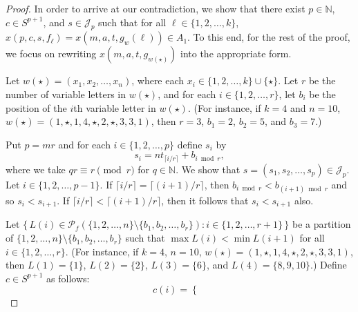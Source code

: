 \documentclass[12pt]{article}
\theoremstyle{plain}
\theoremstyle{definition}
\newcommand{\bbN}{\mathbb{N}}
\newcommand{\calJ}{\mathcal{J}}
\newcommand{\Pf}{\mathcal{P}_f}
\begin{document}
\begin{proof}
  In order to arrive at our contradiction, we show that there exist $p \in \bbN$, $c \in S^{p+1}$, and $s \in \calJ_p$ such that for all $\ell \in \{1, 2, \ldots, k\}$, $ x(p, c, s, f_\ell) = x(m, a, t, g_w(\ell)) \in A_1$. 
  To this end, for the rest of the proof, we focus on rewriting $x(m, a, t, g_{w(\star)})$ into the appropriate form. 

  Let $w(\star) = (x_1, x_2, \ldots, x_n)$, where each $x_i \in \{1, 2, \ldots, k\} \cup \{\star\}$. 
  Let $r$ be the number of variable letters in $w(\star)$, and for each $i \in \{1, 2, \ldots, r\}$, let $b_i$ be the position of the \mbox{$i$th} variable letter in $w(\star)$.
  (For instance, if $k = 4$ and $n = 10$, $w(\star) = (1, \star, 1, 4, \star, 2, \star, 3, 3, 1)$, then $r = 3$, $b_1 = 2$, $b_2 = 5$, and $b_3 = 7$.)

  Put $p = mr$ and for each $i \in \{1, 2, \ldots, p\}$ define $s_i$ by
  \[
    s_i = nt_{\lceil i/r \rceil} + b_{i \bmod r},    
  \]
where we take $qr \equiv r \pmod r$ for $q \in \bbN$.
  We show that $s = (s_1, s_2, \ldots, s_p) \in \calJ_p$.
  Let $i \in \{1, 2, \ldots, p-1\}$.
  If $\lceil i/r \rceil = \lceil (i+1)/r \rceil$, then $b_{i \bmod r} < b_{(i+1) \bmod r}$ and so $s_i < s_{i+1}$.
  If $\lceil i/r \rceil < \lceil (i+1)/r \rceil$, then it follows that $s_i < s_{i+1}$ also.

  Let $\bigl\{\, L(i) \in \Pf(\{1, 2, \ldots, n\} \setminus \{b_1, b_2, \ldots, b_r\}) : i \in \{1, 2, \ldots, r+1\} \,\bigr\}$ be a partition of $\{1, 2, \ldots, n\} \setminus \{b_1, b_2, \ldots, b_r\}$ such that $\max L(i) < \min L(i+1)$ for all $i \in \{1, 2, \ldots, r\}$.
  (For instance, if $k = 4$, $n = 10$, $w(\star) = (1, \star, 1, 4, \star, 2, \star, 3, 3, 1)$, then $L(1) = \{1\}$, $L(2) = \{2\}$, $L(3) = \{6\}$, and $L(4) = \{8, 9, 10\}$.)
  Define $c \in S^{p+1}$ as follows:
  \[
    c(i) = 
    \begin{cases}
      
    \end{cases}
  \]
  

\end{proof}
\end{document}
